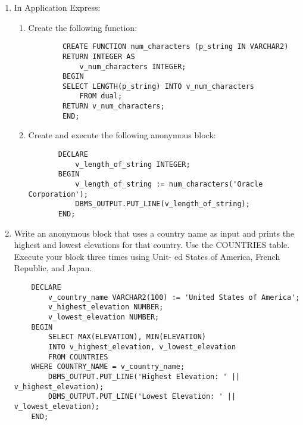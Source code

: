 \documentclass[11pt]{article}
\begin{document}
\begin{enumerate}
\item In Application Express:
\begin{enumerate}
\item Create the following function:
\begin{verbatim}
        CREATE FUNCTION num_characters (p_string IN VARCHAR2)
        RETURN INTEGER AS
            v_num_characters INTEGER;
        BEGIN
        SELECT LENGTH(p_string) INTO v_num_characters
            FROM dual;
        RETURN v_num_characters;
        END;
\end{verbatim}
\item Create and execute the following anonymous block:
\begin{verbatim}
       DECLARE
           v_length_of_string INTEGER;
       BEGIN
           v_length_of_string := num_characters('Oracle Corporation');
           DBMS_OUTPUT.PUT_LINE(v_length_of_string);
       END;
\end{verbatim}
\end{enumerate}
\item Write an anonymous block that uses a country name as input and prints
the highest and lowest elevations for that country. Use the COUNTRIES
table. Execute your block three times using Unit- ed States of America,
French Republic, and Japan.
\begin{verbatim}
    DECLARE
        v_country_name VARCHAR2(100) := 'United States of America';
        v_highest_elevation NUMBER;
        v_lowest_elevation NUMBER;
    BEGIN
        SELECT MAX(ELEVATION), MIN(ELEVATION)
        INTO v_highest_elevation, v_lowest_elevation
        FROM COUNTRIES
    WHERE COUNTRY_NAME = v_country_name;
        DBMS_OUTPUT.PUT_LINE('Highest Elevation: ' || v_highest_elevation);
        DBMS_OUTPUT.PUT_LINE('Lowest Elevation: ' || v_lowest_elevation);
    END;
\end{verbatim}
\end{enumerate}
\end{document}
